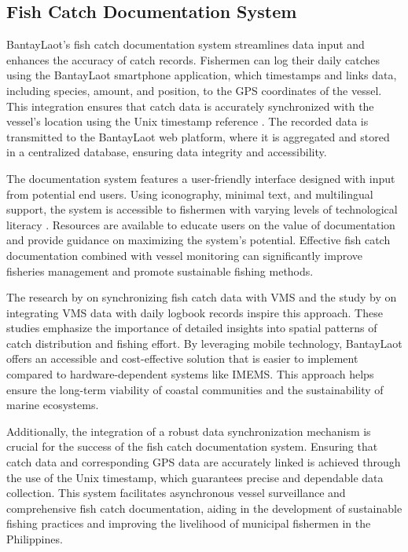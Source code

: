 \documentclass{icsthesis}
\begin{document}
\begin{mainmatter}
            \subsection{Fish Catch Documentation System}
            BantayLaot's fish catch documentation system streamlines data input and enhances the accuracy of catch records. Fishermen can log their daily catches using the BantayLaot smartphone application, which timestamps and links data, including species, amount, and position, to the GPS coordinates of the vessel. This integration ensures that catch data is accurately synchronized with the vessel’s location using the Unix timestamp reference \citep{Wahab2021}. The recorded data is transmitted to the BantayLaot web platform, where it is aggregated and stored in a centralized database, ensuring data integrity and accessibility.
            
            The documentation system features a user-friendly interface designed with input from potential end users. Using iconography, minimal text, and multilingual support, the system is accessible to fishermen with varying levels of technological literacy \citep{Calderwood2022}. Resources are available to educate users on the value of documentation and provide guidance on maximizing the system's potential. Effective fish catch documentation combined with vessel monitoring can significantly improve fisheries management and promote sustainable fishing methods.
            
            The research by \citep{Wahab2021} on synchronizing fish catch data with VMS and the study by \citep{Gerritsen2011} on integrating VMS data with daily logbook records inspire this approach. These studies emphasize the importance of detailed insights into spatial patterns of catch distribution and fishing effort. By leveraging mobile technology, BantayLaot offers an accessible and cost-effective solution that is easier to implement compared to hardware-dependent systems like IMEMS. This approach helps ensure the long-term viability of coastal communities and the sustainability of marine ecosystems.
            
            Additionally, the integration of a robust data synchronization mechanism is crucial for the success of the fish catch documentation system. Ensuring that catch data and corresponding GPS data are accurately linked is achieved through the use of the Unix timestamp, which guarantees precise and dependable data collection. This system facilitates asynchronous vessel surveillance and comprehensive fish catch documentation, aiding in the development of sustainable fishing practices and improving the livelihood of municipal fishermen in the Philippines.

\end{mainmatter}
\end{document}
